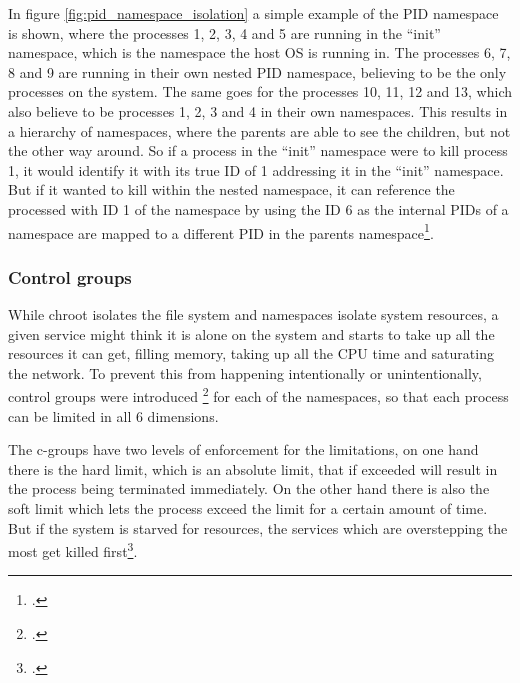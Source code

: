 In figure \ref{fig:pid_namespace_isolation} a simple example of the \ac{PID} namespace is shown,
where the processes 1, 2, 3, 4 and 5 are running in the “init” namespace, which is the namespace the \gls{host} \ac{OS} is running in.
The processes 6, 7, 8 and 9 are running in their own nested \ac{PID} namespace, believing to be the only processes on the system.
The same goes for the processes 10, 11, 12 and 13, which also believe to be processes 1, 2, 3 and 4 in their own namespaces.
This results in a hierarchy of namespaces, where the parents are able to see the children, but not the other way around.
So if a process in the “init” namespace were to kill process 1, it would identify it with its true ID of 1 addressing it in the “init” namespace.
But if it wanted to kill within the nested namespace, it can reference the processed with ID 1 of the namespace by using the ID 6
as the internal \ac{PID}s of a namespace are mapped to a different \ac{PID} in the parents namespace\footcite{michaelkerriskNamespacesOperationPart2013}.

\subsubsection{Control groups}
\label{sec:control_groups}

While chroot isolates the file system and namespaces isolate system resources,
a given service might think it is alone on the system and starts to take up all the resources it can get,
filling memory, taking up all the \ac{CPU} time and saturating the network.
To prevent this from happening intentionally or unintentionally, control groups were introduced \footcite{dockerCgroupsNamespacesWhat2015}
for each of the namespaces, so that each process can be limited in all 6 dimensions.

The c-groups have two levels of enforcement for the limitations,
on one hand there is the hard limit, which is an absolute limit,
that if exceeded will result in the process being terminated immediately.
On the other hand there is also the soft limit which lets the process exceed the limit for a certain amount of time.
But if the system is starved for resources, the services which are overstepping the most get killed first\footcite{linuxkernel-docsMemoryResourceController}.

% 

